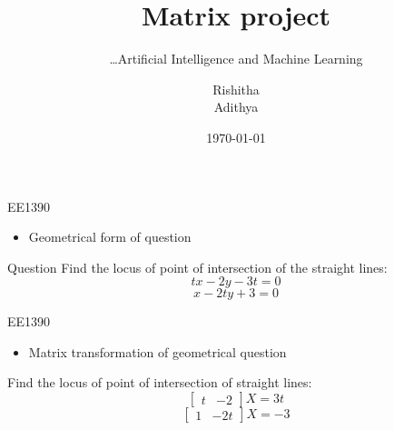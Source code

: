 \documentclass[]{beamer}
\title[Main title]{Matrix project}
\subtitle{\ldots Artificial Intelligence and Machine Learning}
\author[A.\ rishitha]{Rishitha\\Adithya} %
\date{\today} %
\institute[KU Leuven]{Indian Institute Of Technology Hyderabad}
\begin{document}
	{
		\maketitle
	}
	\addtocounter{framenumber}{-1} %

\section{}
\begin{frame}{EE1390}
\begin{itemize}
    \item Geometrical form of question
    
\end{itemize}
\begin{kulblock}{Question}
    Find the locus of point of intersection of the straight lines:
\begin{equation}
    tx-2y-3t=0
\end{equation} 
\begin{equation}
    x-2ty+3=0
\end{equation}
\end{kulblock}
\end{frame}

\begin{frame}{EE1390}
\begin{itemize}
    \item Matrix transformation of geometrical question
\end{itemize}
Find the locus of point of intersection of straight lines:
\[\begin{bmatrix}
    t&-2
\end{bmatrix}
X=3t\]
\[\begin{bmatrix}
1&-2t
\end{bmatrix}
X=-3\]
\end{frame}
\end{document}

